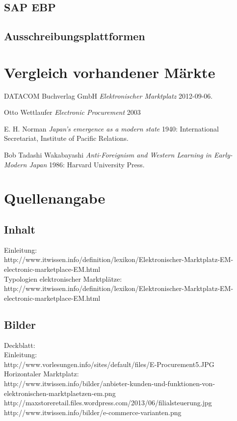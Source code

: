 \documentclass[11pt,a4paper]{article}
\begin{document}
\newpage
\todo
\subsection{SAP EBP}

\todo
\subsection{Ausschreibungsplattformen}

\todo
\section{Vergleich vorhandener Märkte}
\newpage
\begin{thebibliography}{1}
	
	 DATACOM Buchverlag GmbH {\em Elektronischer Marktplatz}  2012-09-06.
	
	  Otto Wettlaufer {\em Electronic Procurement} 2003
	
	 E. H. Norman {\em Japan's emergence as a modern
		state} 1940: International Secretariat, Institute of Pacific
	Relations.
	
	 Bob Tadashi Wakabayashi {\em Anti-Foreignism and Western
		Learning in Early-Modern Japan} 1986: Harvard University Press.
	
\end{thebibliography}
\section{Quellenangabe}
\subsection{Inhalt}
Einleitung: \\
http://www.itwissen.info/definition/lexikon/Elektronischer-Marktplatz-EM-electronic-marketplace-EM.html \\
Typologien elektronischer Marktplätze: \\
http://www.itwissen.info/definition/lexikon/Elektronischer-Marktplatz-EM-electronic-marketplace-EM.html \\
\subsection{Bilder}
Deckblatt: \\
Einleitung: \\ http://www.vorlesungen.info/sites/default/files/E-Procurement5.JPG \\
Horizontaler Marktplatz: \\
http://www.itwissen.info/bilder/anbieter-kunden-und-funktionen-von-elektronischen-marktplaetzen-em.png
\\ 
http://maxstoreretail.files.wordpress.com/2013/06/filialsteuerung.jpg \\
http://www.itwissen.info/bilder/e-commerce-varianten.png \\
\end{document}

